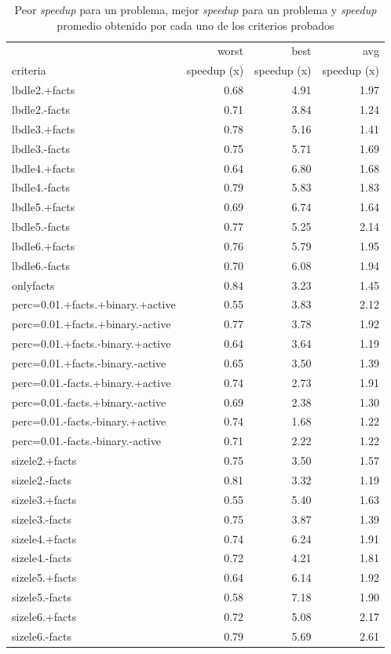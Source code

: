\begin{table}
	\small
	\begin{tabular}{lrrr}
		\toprule
					&	worst 		&	best		&	avg \\
		criteria	&	speedup (x)	&	speedup (x)	&	speedup (x) \\
		\cmidrule(r){1-4}
		lbdle2.+facts	&	0.68	&	4.91	&	1.97 \\
		lbdle2.-facts	&	0.71	&	3.84	&	1.24 \\
		lbdle3.+facts	&	0.78	&	5.16	&	1.41 \\
		lbdle3.-facts	&	0.75	&	5.71	&	1.69 \\
		lbdle4.+facts	&	0.64	&	6.80	&	1.68 \\
		lbdle4.-facts	&	0.79	&	5.83	&	1.83 \\
		lbdle5.+facts	&	0.69	&	6.74	&	1.64 \\
		lbdle5.-facts	&	0.77	&	5.25	&	2.14 \\
		lbdle6.+facts	&	0.76	&	5.79	&	1.95 \\
		lbdle6.-facts	&	0.70	&	6.08	&	1.94 \\
		\cmidrule(r){1-4}
		onlyfacts	&	\cellcolor{green}0.84	&	3.23	&	1.45 \\
		\cmidrule(r){1-4}
		perc=0.01.+facts.+binary.+active	&	\cellcolor{red}0.55	&	3.83	&	2.12 \\
		perc=0.01.+facts.+binary.-active	&	0.77	&	3.78	&	1.92 \\
		perc=0.01.+facts.-binary.+active	&	0.64	&	3.64	&	\cellcolor{red}1.19 \\
		perc=0.01.+facts.-binary.-active	&	0.65	&	3.50	&	1.39 \\
		perc=0.01.-facts.+binary.+active	&	0.74	&	2.73	&	1.91 \\
		perc=0.01.-facts.+binary.-active	&	0.69	&	2.38	&	1.30 \\
		perc=0.01.-facts.-binary.+active	&	0.74	&	\cellcolor{red}1.68	&	1.22 \\
		perc=0.01.-facts.-binary.-active	&	0.71	&	2.22	&	1.22 \\
		\cmidrule(r){1-4}
		sizele2.+facts	&	0.75	&	3.50	&	1.57 \\
		sizele2.-facts	&	0.81	&	3.32	&	\cellcolor{red}1.19 \\
		sizele3.+facts	&	\cellcolor{red}0.55	&	5.40	&	1.63 \\
		sizele3.-facts	&	0.75	&	3.87	&	1.39 \\
		sizele4.+facts	&	0.74	&	6.24	&	1.91 \\
		sizele4.-facts	&	0.72	&	4.21	&	1.81 \\
		sizele5.+facts	&	0.64	&	6.14	&	1.92 \\
		sizele5.-facts	&	0.58	&	\cellcolor{green}7.18	&	1.90 \\
		sizele6.+facts	&	0.72	&	5.08	&	2.17 \\
		sizele6.-facts	&	0.79	&	5.69	&	\cellcolor{green}2.61 \\
		\bottomrule
	\end{tabular}
	\caption{Peor \emph{speedup} para un problema, mejor \emph{speedup} para un problema y \emph{speedup} promedio obtenido por cada uno de los criterios probados}
	\label{tab:rescriterios}
\end{table}

